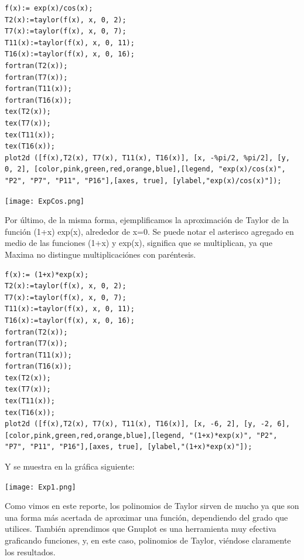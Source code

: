 \documentclass[12pt]{article}
\begin{document}
\begin{verbatim}
f(x):= exp(x)/cos(x);
T2(x):=taylor(f(x), x, 0, 2);
T7(x):=taylor(f(x), x, 0, 7);
T11(x):=taylor(f(x), x, 0, 11);
T16(x):=taylor(f(x), x, 0, 16);
fortran(T2(x));
fortran(T7(x));
fortran(T11(x));
fortran(T16(x));
tex(T2(x));
tex(T7(x));
tex(T11(x));
tex(T16(x));
plot2d ([f(x),T2(x), T7(x), T11(x), T16(x)], [x, -%pi/2, %pi/2], [y, 0, 2], [color,pink,green,red,orange,blue],[legend, "exp(x)/cos(x)", "P2", "P7", "P11", "P16"],[axes, true], [ylabel,"exp(x)/cos(x)"]);
\end{verbatim}

\begin{center}
	\texttt{[image: ExpCos.png]}\\
\end{center}

Por último, de la misma forma, ejemplificamos la aproximación de Taylor de la función (1+x) exp(x), alrededor de x=0. Se puede notar el asterisco agregado en medio de las funciones (1+x) y exp(x), significa que se multiplican, ya que Maxima no distingue multiplicaciónes con paréntesis.

\begin{verbatim}
f(x):= (1+x)*exp(x);
T2(x):=taylor(f(x), x, 0, 2);
T7(x):=taylor(f(x), x, 0, 7);
T11(x):=taylor(f(x), x, 0, 11);
T16(x):=taylor(f(x), x, 0, 16);
fortran(T2(x));
fortran(T7(x));
fortran(T11(x));
fortran(T16(x));
tex(T2(x));
tex(T7(x));
tex(T11(x));
tex(T16(x));
plot2d ([f(x),T2(x), T7(x), T11(x), T16(x)], [x, -6, 2], [y, -2, 6], [color,pink,green,red,orange,blue],[legend, "(1+x)*exp(x)", "P2", "P7", "P11", "P16"],[axes, true], [ylabel,"(1+x)*exp(x)"]);
\end{verbatim}

Y se muestra en la gráfica siguiente:

\begin{center}
	\texttt{[image: Exp1.png]}\\
\end{center}

Como vimos en este reporte, los polinomios de Taylor sirven de mucho ya que son una forma más acertada de aproximar una función, dependiendo del grado que utilices. También aprendimos que Gnuplot es una herramienta muy efectiva graficando funciones, y, en este caso, polinomios de Taylor, viéndose claramente los resultados.

\end{document}

